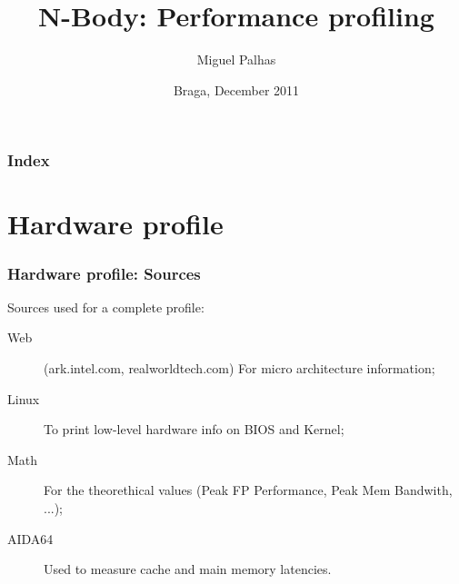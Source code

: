 \documentclass{beamer}
\title{N-Body: Performance profiling}
\author{Miguel Palhas}
\institute[pg19808]{
	Universidade do Minho
}
\date{Braga, December 2011}
\begin{document}

\maketitle%

\begin{frame}
	\frametitle{Index}
	\tableofcontents
\end{frame}

\section{Hardware profile}
\begin{frame}
	\frametitle{Hardware profile: Sources}

	Sources used for a complete profile:
	\begin{description}
		\item[Web] (ark.intel.com, realworldtech.com) For micro architecture information;
		\item[Linux] To print low-level hardware info on BIOS and Kernel;
		\item[Math] For the theorethical values (Peak FP Performance, Peak Mem Bandwith, ...);
		\item[AIDA64] Used to measure cache and main memory latencies.
	\end{description}

\end{frame}
\end{document}
